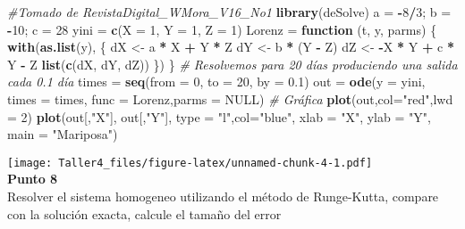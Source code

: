 \documentclass[]{article}
\newenvironment{Shaded}{\begin{snugshade}}{\end{snugshade}}
\newcommand{\KeywordTok}[1]{\textcolor[rgb]{0.13,0.29,0.53}{\textbf{#1}}}
\newcommand{\DataTypeTok}[1]{\textcolor[rgb]{0.13,0.29,0.53}{#1}}
\newcommand{\DecValTok}[1]{\textcolor[rgb]{0.00,0.00,0.81}{#1}}
\newcommand{\FloatTok}[1]{\textcolor[rgb]{0.00,0.00,0.81}{#1}}
\newcommand{\StringTok}[1]{\textcolor[rgb]{0.31,0.60,0.02}{#1}}
\newcommand{\CommentTok}[1]{\textcolor[rgb]{0.56,0.35,0.01}{\textit{#1}}}
\newcommand{\OtherTok}[1]{\textcolor[rgb]{0.56,0.35,0.01}{#1}}
\newcommand{\ControlFlowTok}[1]{\textcolor[rgb]{0.13,0.29,0.53}{\textbf{#1}}}
\newcommand{\OperatorTok}[1]{\textcolor[rgb]{0.81,0.36,0.00}{\textbf{#1}}}
\newcommand{\NormalTok}[1]{#1}
\begin{document}
\begin{Shaded}
\begin{Highlighting}[]
\CommentTok{#Tomado de RevistaDigital_WMora_V16_No1}
\KeywordTok{library}\NormalTok{(deSolve)}
\NormalTok{a =}\StringTok{ }\OperatorTok{-}\DecValTok{8}\OperatorTok{/}\DecValTok{3}\NormalTok{; b =}\StringTok{ }\OperatorTok{-}\DecValTok{10}\NormalTok{; c =}\StringTok{ }\DecValTok{28}
\NormalTok{yini =}\StringTok{ }\KeywordTok{c}\NormalTok{(}\DataTypeTok{X =} \DecValTok{1}\NormalTok{, }\DataTypeTok{Y =} \DecValTok{1}\NormalTok{, }\DataTypeTok{Z =} \DecValTok{1}\NormalTok{)}
\NormalTok{Lorenz =}\StringTok{ }\ControlFlowTok{function}\NormalTok{ (t, y, parms) \{}
\KeywordTok{with}\NormalTok{(}\KeywordTok{as.list}\NormalTok{(y), \{}
\NormalTok{dX <-}\StringTok{ }\NormalTok{a }\OperatorTok{*}\StringTok{ }\NormalTok{X }\OperatorTok{+}\StringTok{ }\NormalTok{Y }\OperatorTok{*}\StringTok{ }\NormalTok{Z}
\NormalTok{dY <-}\StringTok{ }\NormalTok{b }\OperatorTok{*}\StringTok{ }\NormalTok{(Y }\OperatorTok{-}\StringTok{ }\NormalTok{Z)}
\NormalTok{dZ <-}\StringTok{ }\OperatorTok{-}\NormalTok{X }\OperatorTok{*}\StringTok{ }\NormalTok{Y }\OperatorTok{+}\StringTok{ }\NormalTok{c }\OperatorTok{*}\StringTok{ }\NormalTok{Y }\OperatorTok{-}\StringTok{ }\NormalTok{Z}
\KeywordTok{list}\NormalTok{(}\KeywordTok{c}\NormalTok{(dX, dY, dZ))}
\NormalTok{\})}
\NormalTok{\}}
\CommentTok{# Resolvemos para 20 días produciendo una salida cada 0.1 día}
\NormalTok{times =}\StringTok{ }\KeywordTok{seq}\NormalTok{(}\DataTypeTok{from =} \DecValTok{0}\NormalTok{, }\DataTypeTok{to =} \DecValTok{20}\NormalTok{, }\DataTypeTok{by =} \FloatTok{0.1}\NormalTok{)}
\NormalTok{out =}\StringTok{ }\KeywordTok{ode}\NormalTok{(}\DataTypeTok{y =}\NormalTok{ yini, }\DataTypeTok{times =}\NormalTok{ times, }\DataTypeTok{func =}\NormalTok{ Lorenz,}\DataTypeTok{parms =} \OtherTok{NULL}\NormalTok{)}
\CommentTok{# Gráfica}
\KeywordTok{plot}\NormalTok{(out,}\DataTypeTok{col=}\StringTok{"red"}\NormalTok{,}\DataTypeTok{lwd =} \DecValTok{2}\NormalTok{)}
\KeywordTok{plot}\NormalTok{(out[,}\StringTok{"X"}\NormalTok{], out[,}\StringTok{"Y"}\NormalTok{], }\DataTypeTok{type =} \StringTok{"l"}\NormalTok{,}\DataTypeTok{col=}\StringTok{"blue"}\NormalTok{, }\DataTypeTok{xlab =} \StringTok{"X"}\NormalTok{,}
\DataTypeTok{ylab =} \StringTok{"Y"}\NormalTok{, }\DataTypeTok{main =} \StringTok{"Mariposa"}\NormalTok{)}
\end{Highlighting}
\end{Shaded}

\texttt{[image: Taller4\_files/figure-latex/unnamed-chunk-4-1.pdf]}\\
\textbf{Punto 8}\\[2\baselineskip]Resolver el sistema homogeneo
utilizando el método de Runge-Kutta, compare con la solución exacta,
calcule el tamaño del error\\[2\baselineskip]
\end{document}
